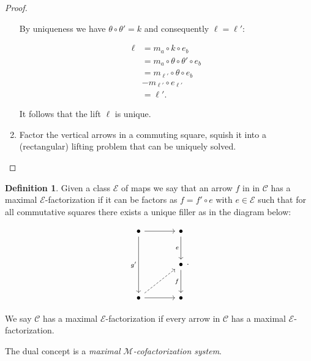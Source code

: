 \documentclass[11pt]{amsart}
\theoremstyle{plain}
\theoremstyle{definition}
\newtheorem{defn}[thm]{Definition}
\newcommand{\cC}{{\mathcal C}}
\newcommand{\cE}{{\mathcal E}}
\newcommand{\cM}{{\mathcal M}}
\newcommand{\noi}{{\noindent}}
\begin{document}
\begin{proof}
\begin{enumerate}
\noi By uniqueness we have $\theta \circ \theta'  = k$ and consequently $\ell = \ell'$:

\begin{align*}
\ell 
&= m_a \circ k \circ e_b \\
&= m_a \circ \theta \circ \theta' \circ e_b \\
&= m_{\ell'} \circ \theta \circ e_b \\
&- m_{\ell'} \circ e_{\ell'}\\
&= \ell' .
\end{align*}

\noi It follows that the lift $\ell$ is unique. \medskip 

\item Factor the vertical arrows in a commuting square, squish it into a (rectangular) lifting problem that can be uniquely solved.   
\end{enumerate}
\end{proof}\medskip 

\begin{defn}
Given a class $\cE$ of maps we say that an arrow $f$ in in $\cC$ has a maximal $\cE$-factorization if it can be factors as $f = f' \circ e $ with $e \in \cE$ such that for all commutative squares there exists a unique filler as in the diagram below: 

\[ \begin{tikzcd}[column sep = large, row sep = large]
  \bullet \rar[] \dar[dd,"g'"'] & \bullet \dar["e"'] \\
  & \bullet \dar["f"']\\
  \bullet \ar[ur, dashed]\rar[] &\bullet
\end{tikzcd}.\] 

\noi We say $\cC$ has a maximal $\cE$-factorization if every arrow in $\cC$ has a maximal $\cE$-factorization. 
\end{defn}

\noi The dual concept is a \textit{maximal $\cM$-cofactorization system}.
\end{document}
